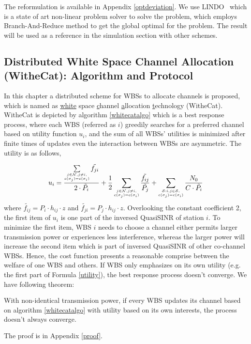 The reformulation is available in Appendix \ref{optdeviation}. We use LINDO~\cite{lindo} which is a state of art non-linear problem solver to solve the problem, which employs Branch-And-Reduce method to get the global optimal for the problem. %
The result will be used as a reference in the simulation section with other schemes. 



\subsection{Distributed White Space Channel Allocation (WitheCat): Algorithm and Protocol}
\label{whitecat}
In this chapter a distributed scheme for WBSs to allocate channels is proposed,  which is named as \underline{white} space \underline{c}hannel \underline{a}llocation \underline{t}echnology (WitheCat). WitheCat is depicted by algorithm \ref{whitecatalgo} which is a best response process, where each WBS (referred as $i$) greedily searches for a preferred channel based on utility function $u_i$, and the sum of all WBSs' utilities is minimized after finite times of updates even the interaction between WBSs are asymmetric. The utility is as follows,

\begin{equation}
\label{utility}
u_i =\dfrac{\sum\limits_{\tiny\substack{j\in \mathcal{N}, j\ne i,\\ c(\sigma_j)=c(\sigma_i)}}\tilde{f_{ji}}}{2\cdot \tilde{P_i}} + \dfrac{1}{2}\sum_{\tiny\substack{j\in \mathcal{N}, j\ne i,\\ c(\sigma_j)=c(\sigma_i)}}\dfrac{\tilde{f_{ij}}}{\tilde{P_j}} + \sum_{\tiny\substack{\mathcal{S}:i,j\in \mathcal{S},\\ c(\sigma_j)=c(\sigma_i)}}\dfrac{N_0}{C\cdot \tilde{P_i}}\\
\end{equation}
where $\tilde{f_{ij}}= P_i\cdot h_{ij}\cdot z$ and $\tilde{f_{ji}}= P_j\cdot h_{ij}\cdot z$.
Overlooking the constant coefficient 2, the first item of $u_i$ is one part of the inversed QuasiSINR of station $i$. To minimize the first item, WBS $i$ needs to choose a channel either permits larger transmission power or experiences less interference, whereas the larger power will increase the second item which is part of inversed QuasiSINR of other co-channel WBSs. Hence, the cost function presents a reasonable comprise between the welfare of one WBS and others. If WBS only emphasizes on its own utility (e.g. the first part of Formula \ref{utility}), the best response process doesn't converge. We have following theorem:
\begin{theorem}
\label{noconvergence}
With non-identical transmission power, if every WBS updates its channel based on algorithm \ref{whitecatalgo} with utility based on its own interests, the process doesn't always converge.
\end{theorem}
The proof is in Appendix \ref{proof}.


